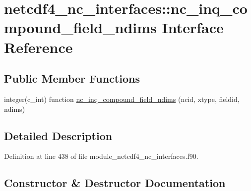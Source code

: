 \hypertarget{interfacenetcdf4__nc__interfaces_1_1nc__inq__compound__field__ndims}{}\section{netcdf4\+\_\+nc\+\_\+interfaces\+:\+:nc\+\_\+inq\+\_\+compound\+\_\+field\+\_\+ndims Interface Reference}
\label{interfacenetcdf4__nc__interfaces_1_1nc__inq__compound__field__ndims}
\subsection*{Public Member Functions}
\begin{DoxyCompactItemize}
\item 
integer(c\+\_\+int) function \hyperlink{interfacenetcdf4__nc__interfaces_1_1nc__inq__compound__field__ndims_a78ff7d843d2ec9e71c728589846e06de}{nc\+\_\+inq\+\_\+compound\+\_\+field\+\_\+ndims} (ncid, xtype, fieldid, ndims)
\end{DoxyCompactItemize}


\subsection{Detailed Description}


Definition at line 438 of file module\+\_\+netcdf4\+\_\+nc\+\_\+interfaces.\+f90.



\subsection{Constructor \& Destructor Documentation}
\mbox{\label{interfacenetcdf4__nc__interfaces_1_1nc__inq__compound__field__ndims_a78ff7d843d2ec9e71c728589846e06de}} 
